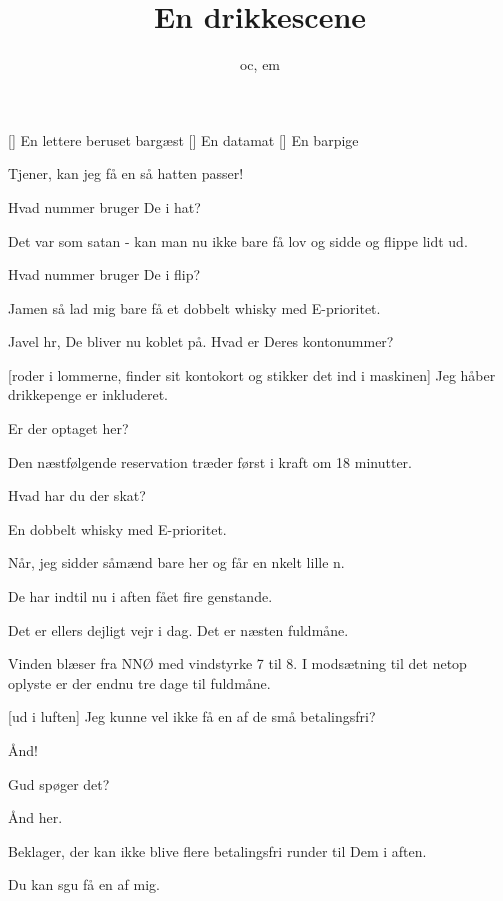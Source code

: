 \documentclass[a4paper,11pt]{article}
\title{En drikkescene}
\author{oc, em}
\begin{document}
\maketitle

\begin{roles}
[] En lettere beruset bargæst
[] En datamat
[] En barpige
\end{roles}

\begin{sketch}


 Tjener, kan jeg få en så hatten passer!

 Hvad nummer bruger De i hat?

 Det var som satan - kan man nu ikke bare få lov og sidde og
flippe lidt ud.

 Hvad nummer bruger De i flip?

 Jamen så lad mig bare få et dobbelt whisky med E-prioritet.

 Javel hr, De bliver nu koblet på.  Hvad er Deres kontonummer?

[roder i lommerne, finder sit kontokort og stikker det ind i
maskinen] Jeg håber drikkepenge er inkluderet.


 Er der optaget her?

 Den næstfølgende reservation træder først i kraft om 18
minutter.

 Hvad har du der skat?

 En dobbelt whisky med E-prioritet.

 Når, jeg sidder såmænd bare her og får en nkelt lille n.

 De har indtil nu i aften fået fire genstande.

 Det er ellers dejligt vejr i dag.  Det er næsten fuldmåne.

 Vinden blæser fra NNØ med vindstyrke 7 til 8.  I modsætning
til det netop oplyste er der endnu tre dage til fuldmåne.

[ud i luften] Jeg kunne vel ikke få en af de små betalingsfri?

 Ånd!

 Gud spøger det?

 Ånd her.


 Beklager, der kan ikke blive flere betalingsfri runder til Dem i aften.

 Du kan sgu få en af mig.  

\end{sketch}
\end{document}
